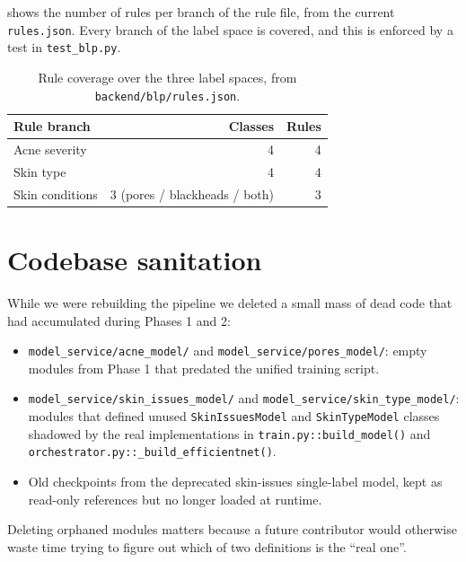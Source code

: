 \documentclass[11pt,a4paper,oneside]{report}
\begin{document}
 shows the number of rules per branch of
the rule file, from the current \texttt{rules.json}. Every branch
of the label space is covered, and this is enforced by a test in
\texttt{test\_blp.py}.

\begin{table}[htbp]
    \centering
    \caption{Rule coverage over the three label spaces, from
    \texttt{backend/blp/rules.json}.}
    \label{tab:rule-coverage}
    \small
    \begin{tabular}{lrr}
        \toprule
        \textbf{Rule branch} & \textbf{Classes} & \textbf{Rules} \\
        \midrule
        Acne severity         & 4 & 4 \\
        Skin type             & 4 & 4 \\
        Skin conditions       & 3 (pores / blackheads / both) & 3 \\
        \bottomrule
    \end{tabular}
\end{table}

\section{Codebase sanitation}

While we were rebuilding the pipeline we deleted a small mass of
dead code that had accumulated during Phases 1 and 2:

\begin{itemize}
    \item \texttt{model\_service/acne\_model/} and
        \texttt{model\_service/pores\_model/}: empty modules from
        Phase 1 that predated the unified training script.
    \item \texttt{model\_service/skin\_issues\_model/} and
        \texttt{model\_service/skin\_type\_model/}: modules that
        defined unused \texttt{SkinIssuesModel} and
        \texttt{SkinTypeModel} classes shadowed by the real
        implementations in \texttt{train.py::build\_model()} and
        \texttt{orchestrator.py::\_build\_efficientnet()}.
    \item Old checkpoints from the deprecated skin-issues single-label
        model, kept as read-only references but no longer loaded at
        runtime.
\end{itemize}

Deleting orphaned modules matters because a future contributor
would otherwise waste time trying to figure out which of two
definitions is the ``real one''.
\end{document}
